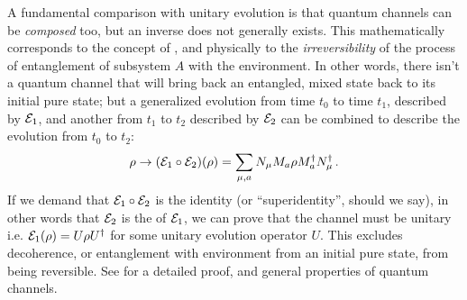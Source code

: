 A fundamental comparison with unitary evolution is that
quantum channels can be \emph{composed} too, but an inverse
does not generally exists.
This mathematically corresponds to the concept of ,
and physically to the \emph{irreversibility} of the process
of entanglement of subsystem $A$ with the environment. In other words,
there isn't a quantum channel that will bring back an entangled,
mixed state back to its initial pure state;
but a generalized evolution from time $t_0$ to time $t_1$,
described by $\mathcal{E}_1$,
and another from $t_1$ to $t_2$ described by $\mathcal{E}_2$
can be combined to describe the evolution from $t_0$ to $t_2$:
\[
  \rho \rightarrow \qty(\mathcal{E}_1 \circ \mathcal{E}_2) (\rho) =
  \sum_{\mu,a} N_{\mu} M_a \rho M_a^{\dagger} N_{\mu}^{\dagger}
  \,\text{.}
\]
If we demand that $\mathcal{E}_1 \circ \mathcal{E}_2$
is the identity (or ``superidentity'', should we say),
in other words that $\mathcal{E}_2$
is the  of $\mathcal{E}_1$,
we can prove that the channel must be unitary i.e.
$\mathcal{E}_1(\rho) = U \rho U^{\dagger}$
for some unitary evolution operator $U$.
This excludes decoherence,
or entanglement with environment from an initial pure state,
from being reversible.
See \cite[Sec. 3.2]{PreskillNotes} for a detailed proof,
and general properties of quantum channels.
